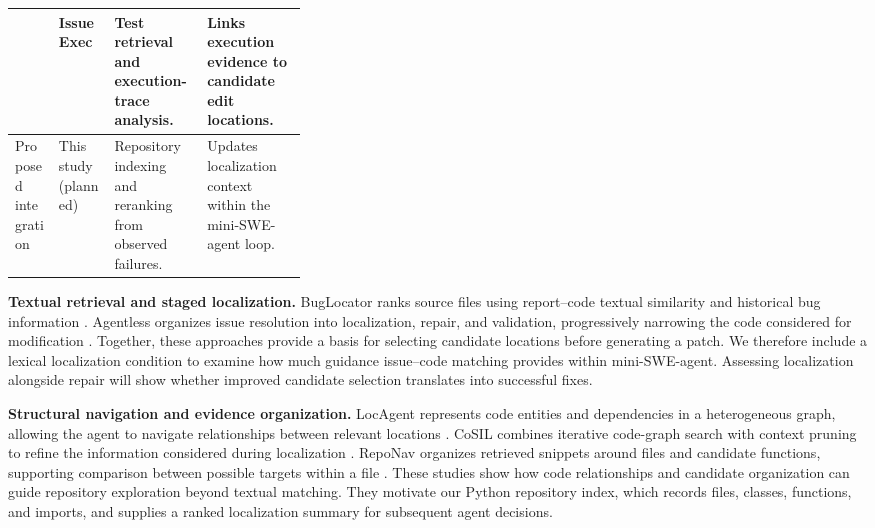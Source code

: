 \documentclass[11pt]{article}
\begin{document}
\begin{table}[H]
\begin{tabularx}{\linewidth}{
    @{}
    >{\raggedright\arraybackslash}p{0.15\linewidth}
    >{\raggedright\arraybackslash}p{0.19\linewidth}
    >{\raggedright\arraybackslash}X
    >{\raggedright\arraybackslash}X
    @{}
}
& IssueExec \cite{liu2026issueexec}
& Test retrieval and execution-trace analysis.
& Links execution evidence to candidate edit locations. \\

\midrule

Proposed integration
& This study (planned)
& Repository indexing and reranking from observed failures.
& Updates localization context within the mini-SWE-agent loop. \\

\bottomrule
\end{tabularx}
\end{table}

\textbf{Textual retrieval and staged localization.}
BugLocator ranks source files using report--code textual similarity
and historical bug information \cite{zhou2012buglocator}.
Agentless organizes issue resolution into localization, repair,
and validation, progressively narrowing the code considered for
modification \cite{xia2024agentless}.
Together, these approaches provide a basis for selecting candidate
locations before generating a patch.
We therefore include a lexical localization condition to examine
how much guidance issue--code matching provides within mini-SWE-agent.
Assessing localization alongside repair will show whether improved
candidate selection translates into successful fixes.

\textbf{Structural navigation and evidence organization.}
LocAgent represents code entities and dependencies in a heterogeneous
graph, allowing the agent to navigate relationships between relevant
locations \cite{chen2025locagent}.
CoSIL combines iterative code-graph search with context pruning
to refine the information considered during localization
\cite{jiang2025cosil}.
RepoNav organizes retrieved snippets around files and candidate
functions, supporting comparison between possible targets within
a file \cite{chai2026reponav}.
These studies show how code relationships and candidate organization
can guide repository exploration beyond textual matching.
They motivate our Python repository index, which records files,
classes, functions, and imports, and supplies a ranked localization
summary for subsequent agent decisions.
\end{document}
